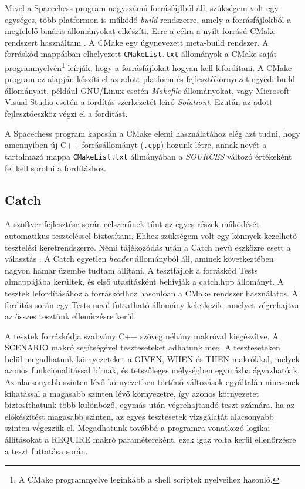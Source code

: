 \documentclass[12pt, twoside]{report}
\begin{document}
Mivel a Spacechess program nagyszámú forrásfájlból áll, szükségem volt egy egységes, több platformon is működő \emph{build}-rendszerre, amely a forrásfájlokból a megfelelő bináris állományokat elkészíti. Erre a célra a nyílt forrású CMake rendszert használtam \cite{cmake}. A CMake egy úgynevezett meta-build rendszer. A forráskód mappáiban elhelyezett {\tt CMakeList.txt} állományok a CMake saját programnyelvén\footnote{A CMake programnyelve leginkább a shell scriptek nyelveihez hasonló.} leírják, hogy a for\-rás\-fáj\-lo\-kat hogyan kell lefordítani. A CMake program ez alapján készíti el az adott platform és fejlesztőkörnyezet egyedi build állományait, például GNU/Linux esetén \emph{Makefile} állományokat, vagy Microsoft Visual Studio esetén a fordítás szerkezetét leíró \emph{Solutiont}. Ezután az adott fejlesztőeszköz végzi el a fordítást.

A Spacechess program kapcsán a CMake elemi használatához elég azt tudni, hogy amennyiben új C++ forrásállományt ({\tt *.cpp}) hozunk létre, annak nevét a tartalmazó mappa {\tt CMakeList.txt} állmányában a \emph{SOURCES} változó értékeként fel kell sorolni a fordításhoz.

\subsection{Catch}

A szoftver fejlesztése során célszerűnek tűnt az egyes részek működését automatikus teszteléssel biztosítani. Ehhez szükségem volt egy könnyek kezelhető tesztelési keretrendszerre. Némi tájékozódás után a Catch nevű eszközre esett a választás \cite{catch}. A Catch egyetlen \emph{header} állományból áll, aminek következtében nagyon hamar üzembe tudtam állítani. A tesztfájlok a forráskód Tests almappájába kerültek, és első utasításként behívják a catch.hpp állományt. A tesztek lefordításához a forráskódhoz hasonlóan a CMake rendszer használatos. A fordítás során egy Tests nevű futtatható állomány keletkezik, amelyet végrehajtva az összes tesztünk ellenőrzésre kerül.

A tesztek forráskódja szabvány C++ szöveg néhány makróval kiegészítve. A SCENARIO makró segítségével teszteseteket adhatunk meg. A teszteseteken belül megadhatunk környezeteket a GIVEN, WHEN és THEN makrókkal, melyek azonos funkcionalitással bírnak, és tetszőleges mélységben egymásba ágyazhatóak. Az alacsonyabb szinten lévő környezetben történő változások egyáltalán nincsenek kihatással a magasabb szinten lévő környezetre, így azonos környezetet biztosíthatunk több különböző, egymás után végrehajtandó teszt számára, ha az előkészítést magasabb szinten, az egyes tesztesetek vizsgálatát alacsonyabb szinten végezzük el. Megadhatunk továbbá a programra vonatkozó logikai állításokat a REQUIRE makró paramétereként, ezek igaz volta kerül ellenőrzésre a teszt futtatása során.
\end{document}
